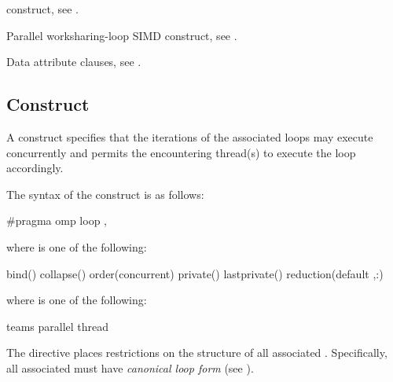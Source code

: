 \begin{crossrefs}
\item {} construct, see
.

\item Parallel worksharing-loop SIMD construct, see
.

\item Data attribute clauses, see .
\end{crossrefs}



\subsection{ Construct}
\label{subsec:loop Construct}
\summary
A  construct specifies that the iterations of the associated
loops may execute concurrently and permits the encountering thread(s) to
execute the loop accordingly.

\begin{samepage}
\syntax
\begin{ccppspecific}
The syntax of the  construct is as follows:
\begin{ompcPragma}
#pragma omp loop \plc{[clause[ [},\plc{] clause] ... ] new-line}
\end{ompcPragma}

where  is one of the following:

\begin{indentedcodelist}
bind()
collapse()
order(concurrent)
private()
lastprivate()
reduction(\plc{[}default ,\plc{]reduction-identifier }:)
\end{indentedcodelist}

where  is one of the following:
\begin{indentedcodelist}
  teams
  parallel
  thread
\end{indentedcodelist}

The  directive places restrictions on the structure of all associated 
. Specifically, all associated  must have 
\emph{canonical loop form} (see ).
\end{ccppspecific}
\end{samepage}

